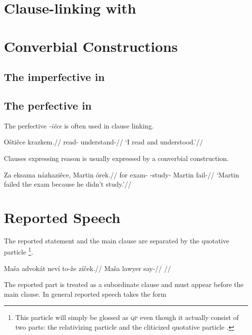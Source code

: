 \section{Clause-linking with }

\section{Converbial Constructions}\label{converbs-syntax}

\subsection{The imperfective in }



\subsection{The perfective in }

The perfective \textit{-iêce} is often used in clause linking.

\pex
\begingl
\gla O\v{s}tiêce krazkem.//
\glb read- understand-//
\glft `I read and understood.'//
\endgl
\xe

Clauses expressing reason is usually expressed by a converbial construction.

\pex
\begingl
\gla Za eksama názhaziêce, Martin órek.//
\glb for exam- -study- Martin fail-//
\glft `Martin failed the exam because he didn't study.'//
\endgl
\xe

\section{Reported Speech}\label{sec:reportedspeech}

The reported statement and the main clause are separated by the quotative particle \footnote{This particle will simply be glossed as {\scshape qp} even though it actually consist of two parts: the relativizing particle  and the cliticized quotative particle .}.

\pex
\begingl
\gla Ma\v{s}a advok\'at nev\'i to-\v{z}e z\'i\v{c}ek.//
\glb Ma\v{s}a lawyer   say-//
\glft {}//
\endgl
\xe

The reported part is treated as a subordinate clause and must appear before the main clause. In general reported speech takes the form

